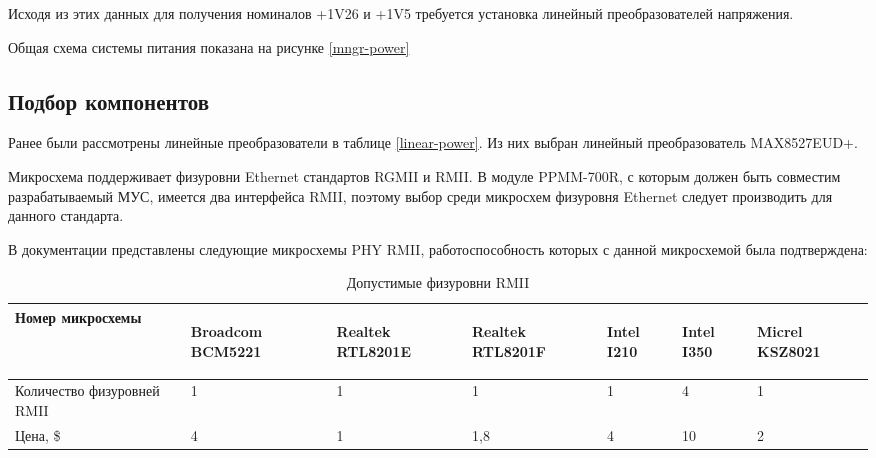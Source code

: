 Исходя из этих данных для получения номиналов +1V26 и +1V5 требуется установка линейный преобразователей напряжения.

Общая схема системы питания показана на рисунке \ref{mngr-power}


\subsection{Подбор компонентов}

Ранее были рассмотрены линейные преобразователи в таблице \ref{linear-power}.
Из них выбран линейный преобразователь MAX8527EUD+.

Микросхема поддерживает физуровни Ethernet стандартов RGMII и RMII. В модуле PPMM-700R, с которым должен быть совместим разрабатываемый МУС, имеется два интерфейса RMII, поэтому выбор среди микросхем физуровня Ethernet следует производить для данного стандарта.

В документации представлены следующие микросхемы PHY RMII, работоспособность которых с данной микросхемой была подтверждена:

\begin{table}[H]
	\caption{Допустимые физуровни RMII}\label{rmii-phy}
	\begin{tabular}{|l|l|l|l|l|l|l|}
		\hline Номер микросхемы & 
		\begin{sideways} Broadcom BCM5221 \end{sideways} & 
		\begin{sideways} Realtek RTL8201E \end{sideways} &
		\begin{sideways} Realtek RTL8201F \end{sideways} &
		\begin{sideways} Intel I210 \end{sideways} & 
		\begin{sideways} Intel I350 \end{sideways} &
		\begin{sideways} Micrel KSZ8021 \end{sideways} \\
		\hline Количество физуровней RMII & 1 & 1 & 1 & 1 & 4 & 1 \\
		\hline Цена, \$ & 4 & 1 & 1,8 & 4 & 10 & 2 \\
		\hline 
	\end{tabular}
\end{table}


